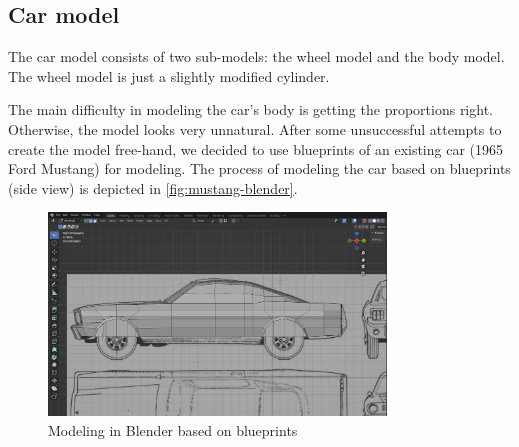 \subsection{Car model}

The car model consists of two sub-models: the wheel model and the body model.
The wheel model is just a slightly modified cylinder.

The main difficulty in modeling the car's body is getting the proportions right.
Otherwise, the model looks very unnatural.
After some unsuccessful attempts to create the model free-hand, we decided to use blueprints of an existing car (1965 Ford Mustang) for modeling.
The process of modeling the car based on blueprints (side view) is depicted in \autoref{fig:mustang-blender}.

\begin{figure}[h]
    \centering
    \includegraphics[width=0.8\textwidth]{chapters/theoretical_foundations/sections/models/resources/mustang-blender.png}
    \caption{Modeling in Blender based on blueprints}
    \label{fig:mustang-blender}
\end{figure}
